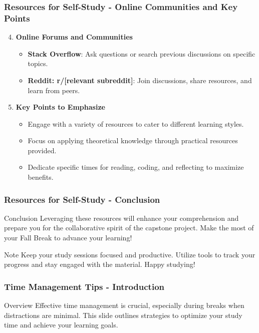\documentclass[aspectratio=169]{beamer}
\begin{document}
\begin{frame}[fragile]
    \frametitle{Resources for Self-Study - Online Communities and Key Points}
    \begin{enumerate}
        \setcounter{enumi}{3} %
        \item \textbf{Online Forums and Communities}
        \begin{itemize}
            \item \textbf{Stack Overflow}: Ask questions or search previous discussions on specific topics.
            \item \textbf{Reddit: r/[relevant subreddit]}: Join discussions, share resources, and learn from peers.
        \end{itemize}
        
        \item \textbf{Key Points to Emphasize}
        \begin{itemize}
            \item Engage with a variety of resources to cater to different learning styles.
            \item Focus on applying theoretical knowledge through practical resources provided.
            \item Dedicate specific times for reading, coding, and reflecting to maximize benefits.
        \end{itemize}
    \end{enumerate}
\end{frame}

\begin{frame}[fragile]
    \frametitle{Resources for Self-Study - Conclusion}
    \begin{block}{Conclusion}
        Leveraging these resources will enhance your comprehension and prepare you for the collaborative spirit of the capstone project. 
        Make the most of your Fall Break to advance your learning!
    \end{block}
    \begin{block}{Note}
        Keep your study sessions focused and productive. Utilize tools to track your progress and stay engaged with the material. Happy studying!
    \end{block}
\end{frame}

\begin{frame}[fragile]
    \frametitle{Time Management Tips - Introduction}
    \begin{block}{Overview}
        Effective time management is crucial, especially during breaks when distractions are minimal. This slide outlines strategies to optimize your study time and achieve your learning goals.
    \end{block}
\end{frame}
\end{document}
